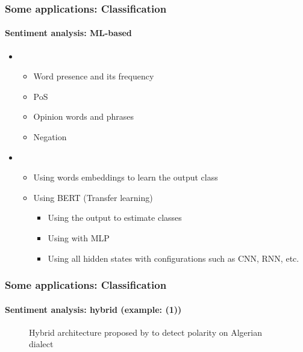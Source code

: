 \documentclass[xcolor=table]{beamer}
\begin{document}
\begin{frame}
	\frametitle{Some applications: Classification}
	\framesubtitle{Sentiment analysis: ML-based}
	
	\begin{itemize}
		\item {}
		\begin{itemize}
			\item Word presence and its frequency 
			\item PoS
			\item Opinion words and phrases
			\item Negation
		\end{itemize}
		\item {}
		\begin{itemize}
			\item Using words embeddings to learn the output class
			\item Using BERT (Transfer learning)
			\begin{itemize}
				\item Using the output \keyword{[CLS]} to estimate classes
				\item Using \keyword{[CLS]} with MLP
				\item Using all hidden states with configurations such as CNN, RNN, etc.
			\end{itemize}
		\end{itemize}
	\end{itemize}

\end{frame}

\begin{frame}
	\frametitle{Some applications: Classification}
	\framesubtitle{Sentiment analysis: hybrid (example: \cite{18-bettiche-al} (1))}
	
	\begin{figure}
		\centering
		\caption{Hybrid architecture proposed by \cite{18-bettiche-al} to detect polarity on Algerian dialect}
	\end{figure}
	
\end{frame}
\end{document}
